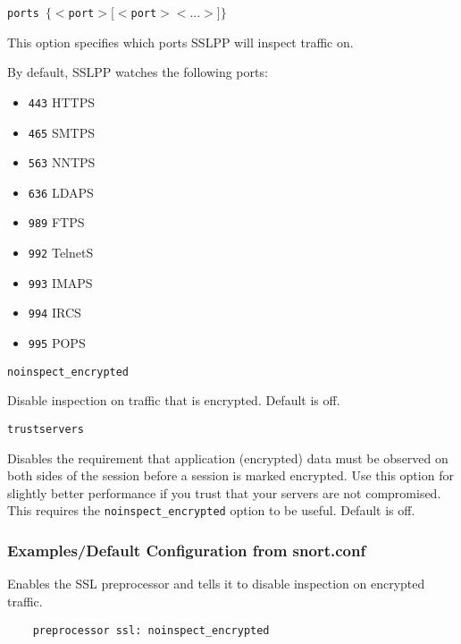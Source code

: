 \documentclass[english]{report}
\newcounter{slistnum}
\newenvironment{slist}
{ \begin{list}{ {\bf \arabic{slistnum}.} }{\usecounter{slistnum} } }
{ \end{list} }
\begin{document}
\begin{slist}

\item \texttt{ports $\{ <$port$> [<$port$> <...>] \}$}

This option specifies which ports SSLPP will inspect traffic on.

By default, SSLPP watches the following ports:
    
\begin{itemize}
    \item \texttt{443}     HTTPS   
    \item \texttt{465}     SMTPS   
    \item \texttt{563}     NNTPS                                                                
    \item \texttt{636}     LDAPS
    \item \texttt{989}     FTPS
    \item \texttt{992}     TelnetS  
    \item \texttt{993}     IMAPS                 
    \item \texttt{994}     IRCS
    \item \texttt{995}     POPS
\end{itemize}

\item \texttt{noinspect\_encrypted}

Disable inspection on traffic that is encrypted.  Default is off.

\item \texttt{trustservers}

Disables the requirement that application (encrypted) data must be observed on
both sides of the session before a session is marked encrypted.  Use this
option for slightly better performance if you trust that your servers are not
compromised.  This requires the \texttt{noinspect\_encrypted} option to be
useful.  Default is off.  \end{slist}

\subsubsection{Examples/Default Configuration from snort.conf}

Enables the SSL preprocessor and tells it to disable inspection on encrypted
traffic.

\begin{verbatim}
    preprocessor ssl: noinspect_encrypted
\end{verbatim}
\end{document}
